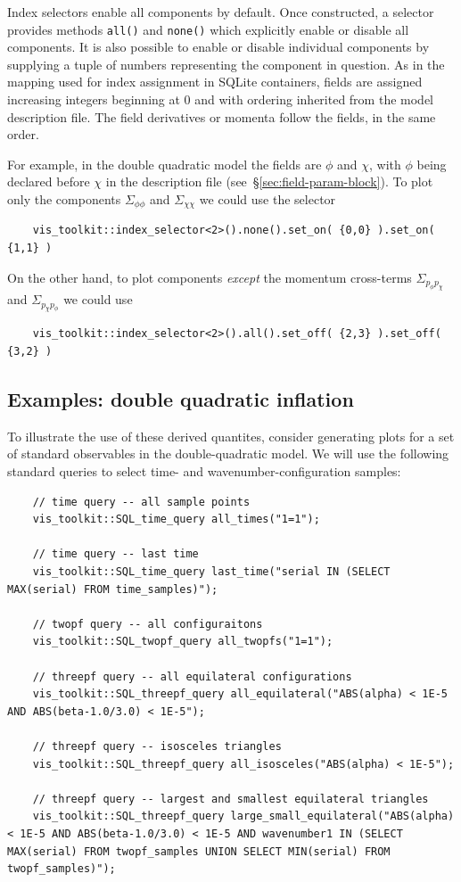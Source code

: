 \documentclass[11pt,a4paper]{article}
\newcommand{\packagefont}{\sffamily}
\newcommand{\SQLite}{{\packagefont SQLite}}
\begin{document}
Index selectors enable all components by default.
Once constructed, a selector provides methods
\texttt{all()}
and
\texttt{none()}
which explicitly enable or disable all components.
It is also possible to enable or disable individual
components by supplying a tuple of numbers representing
the component in question.
As in the mapping used for index assignment in {\SQLite} containers,
fields are assigned increasing integers beginning at 0
and with ordering inherited from the model description file.
The field derivatives or momenta
follow the fields, in the same order.

For example, in the double quadratic model the fields are
$\phi$ and $\chi$, with $\phi$ being declared before $\chi$
in the description file (see~\S\ref{sec:field-param-block}).
To plot only the components $\Sigma_{\phi\phi}$ and
$\Sigma_{\chi\chi}$ we could use the selector
\begin{verbatim}    
    vis_toolkit::index_selector<2>().none().set_on( {0,0} ).set_on( {1,1} )
\end{verbatim}
On the other hand, to plot components \emph{except} the
momentum cross-terms
$\Sigma_{p_\phi p_\chi}$
and
$\Sigma_{p_\chi p_\phi}$
we could use
\begin{verbatim}
    vis_toolkit::index_selector<2>().all().set_off( {2,3} ).set_off( {3,2} )    
\end{verbatim}

\subsection{Examples: double quadratic inflation}
To illustrate the use of these derived quantites, consider generating
plots for a set of standard observables in the double-quadratic model.
We will use the following standard queries to select time- and wavenumber-configuration
samples:
\begin{verbatim}
    // time query -- all sample points
    vis_toolkit::SQL_time_query all_times("1=1");

    // time query -- last time
    vis_toolkit::SQL_time_query last_time("serial IN (SELECT MAX(serial) FROM time_samples)");

    // twopf query -- all configuraitons
    vis_toolkit::SQL_twopf_query all_twopfs("1=1");

    // threepf query -- all equilateral configurations
    vis_toolkit::SQL_threepf_query all_equilateral("ABS(alpha) < 1E-5 AND ABS(beta-1.0/3.0) < 1E-5");

    // threepf query -- isosceles triangles
    vis_toolkit::SQL_threepf_query all_isosceles("ABS(alpha) < 1E-5");

    // threepf query -- largest and smallest equilateral triangles
    vis_toolkit::SQL_threepf_query large_small_equilateral("ABS(alpha) < 1E-5 AND ABS(beta-1.0/3.0) < 1E-5 AND wavenumber1 IN (SELECT MAX(serial) FROM twopf_samples UNION SELECT MIN(serial) FROM twopf_samples)");
\end{verbatim}
\end{document}
